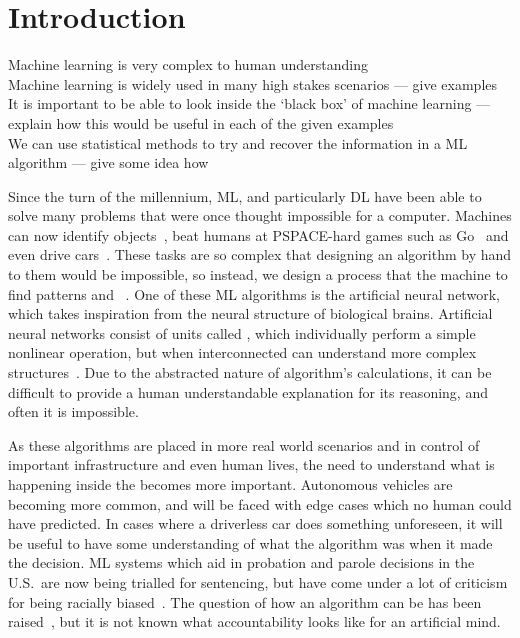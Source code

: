 
\chapter{Introduction}

\begin{todo}
	Machine learning is very complex to human understanding \\
	Machine learning is widely used in many high stakes scenarios --- give examples \\
	It is important to be able to look inside the `black box' of machine learning --- explain how this would be useful in each of the given examples \\
	We can use statistical methods to try and recover the information in a ML algorithm --- give some idea how
\end{todo}

Since the turn of the millennium, \ac{ML}, and particularly \ac{DL} have been able to solve many problems that were once thought impossible for a computer.
Machines can now identify objects~\autocite{li2018}, beat humans at PSPACE-hard games such as Go~\autocite{chao2018} and even drive cars~\autocite{gerla2014}.
These tasks are so complex that designing an algorithm by hand to  them would be impossible, so instead, we design a process that  the machine to find patterns and ~\autocite[1]{murphy2012}.
One of these \ac{ML} algorithms is the artificial neural network, which takes inspiration from the neural structure of biological brains.
Artificial neural networks consist of units called , which individually perform a simple nonlinear operation, but when interconnected can understand more complex structures~\autocite[436]{lecun2015}.
Due to the abstracted nature of  algorithm's calculations, it can be difficult to provide a human understandable explanation for its reasoning, and often it is impossible.

As these algorithms are placed in more real world scenarios and in control of important infrastructure and even human lives, the need to understand what is happening inside the  becomes more important.
Autonomous vehicles are becoming more common, and will be faced with edge cases which no human could have predicted.
In cases where a driverless car does something unforeseen, it will be useful to have some understanding of what the algorithm was  when it made the decision.
\ac{ML} systems which aid in probation and parole decisions in the U.S.\ are now being trialled for sentencing, but have come under a lot of criticism for being racially biased~\autocite{christin2015}.
The question of how an algorithm can be  has been raised~\autocite[9]{christin2015}, but it is not known what accountability looks like for an artificial mind.
